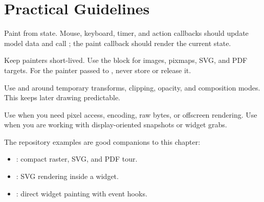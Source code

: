\section{Practical Guidelines}

Paint from state. Mouse, keyboard, timer, and action callbacks should update model data and call ; the paint callback should render the current state.

Keep painters short-lived. Use the  block for images, pixmaps, SVG, and PDF targets. For the painter passed to , never store or release it.

Use  and  around temporary transforms, clipping, opacity, and composition modes. This keeps later drawing predictable.

Use  when you need pixel access, encoding, raw bytes, or offscreen rendering. Use  when you are working with display-oriented snapshots or widget grabs.

The repository examples are good companions to this chapter:

\begin{itemize}
\item {}: compact raster, SVG, and PDF tour.
\item {}: SVG rendering inside a widget.
\item {}: direct widget painting with event hooks.
\end{itemize}
